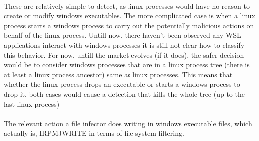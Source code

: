         \paragraph{}
        These are relatively simple to detect, as linux processes would have no reason to create or modify windows executables. The more
        complicated case is when a linux process starts a windows process to carry out the potentially malicious actions on behalf of the linux
        process. Untill now, there haven't been observed any WSL applications interact with windows processes it is still not clear how to
        classify this behavior. For now, untill the market evolves (if it does), the safer decision would be to consider windows processes
        that are in a linux process tree (there is at least a linux process ancestor) same as linux processes. This means that whether the linux
        process drops an executable or starts a windows process to drop it, both cases would cause a detection that kills the whole tree
        (up to the last linux process)

        \paragraph{}
        The relevant action a file infector does writing in windows executable files, which actually is,
        IRP\textunderscore MJ\textunderscore WRITE in terms of file system filtering. 
